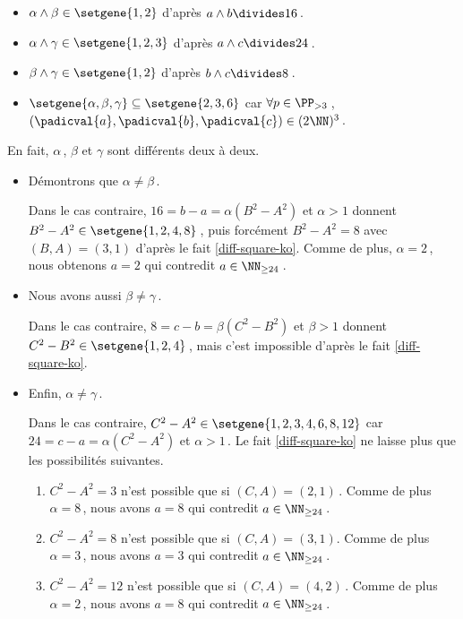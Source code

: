 \begin{itemize}
	\item $\alpha \wedge \beta \in \setgene{1, 2}$
	d'après $a \wedge b \divides 16$\,.

	\item $\alpha \wedge \gamma \in \setgene{1, 2, 3}$
	d'après $a \wedge c \divides 24$\,.

	\item $\beta \wedge \gamma \in \setgene{1, 2}$
	d'après $b \wedge c \divides 8$\,.

	\item $\setgene{\alpha, \beta, \gamma} \subseteq \setgene{2, 3, 6}$
	car $\forall p \in \PP_{>3}$\,, $(\padicval{a}, \padicval{b}, \padicval{c}) \in ( 2 \NN )^3$\,. 
\end{itemize}
		
\newpage

En fait, $\alpha$\,, $\beta$ et $\gamma$ sont différents deux à deux.
	
\begin{itemize}	
	\item Démontrons que $\alpha \neq \beta$\,. 
		
	\noindent
	Dans le cas contraire, $16 = b - a = \alpha(B^2 - A^2)$ et $\alpha > 1$ donnent $B^2 - A^2 \in \setgene{1, 2, 4, 8}$\,, puis forcément $B^2 - A^2 = 8$ avec $(B, A) = (3, 1)$ d'après le fait \ref{diff-square-ko}.
	Comme de plus, $\alpha = 2$\,, nous obtenons $a = 2$ qui contredit $a \in \NN_{\geq 24}$\,.		

	\item Nous avons aussi $\beta \neq \gamma$\,. 
		
	\noindent
	Dans le cas contraire, $8 = c - b = \beta(C^2 - B^2)$ et $\beta > 1$ donnent $C^2 - B^2 \in \setgene{1, 2, 4}$\,, mais c'est impossible d'après le fait \ref{diff-square-ko}.
		

	\item Enfin, $\alpha \neq \gamma$\,. 
		
	\noindent
	Dans le cas contraire,
	$C^2 - A^2 \in \setgene{1, 2, 3, 4, 6, 8, 12}$
	car 
	$24 = c - a = \alpha(C^2 - A^2)$ et $\alpha > 1$\,.
	Le fait \ref{diff-square-ko} ne laisse plus que les possibilités suivantes.
	\begin{enumerate}
		\item $C^2 - A^2 = 3$ n'est possible que si $(C, A) = (2, 1)$\,.
		Comme de plus $\alpha = 8$\,, nous avons $a = 8$ qui contredit $a \in \NN_{\geq 24}$\,.
			
			
		\item $C^2 - A^2 = 8$ n'est possible que si $(C, A) = (3, 1)$.
		Comme de plus $\alpha = 3$\,, nous avons $a = 3$ qui contredit $a \in \NN_{\geq 24}$\,.
			
		
		\item $C^2 - A^2 = 12$ n'est possible que si $(C, A) = (4, 2)$\,.
		Comme de plus $\alpha = 2$\,, nous avons $a = 8$ qui contredit $a \in \NN_{\geq 24}$\,.
	\end{enumerate}
\end{itemize}


